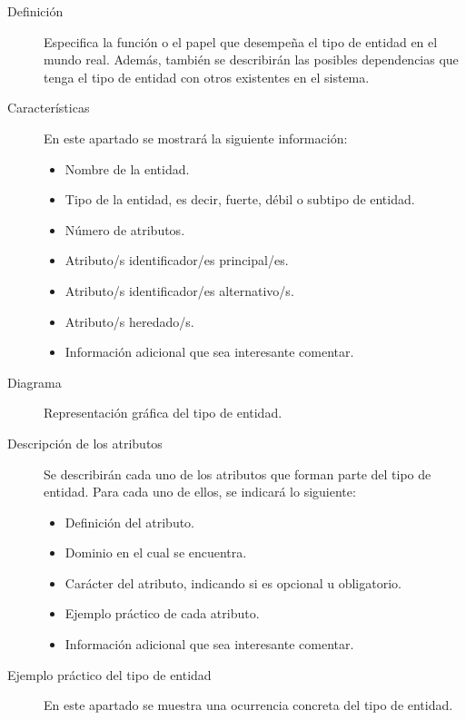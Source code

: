    \begin{description}
      \item[Definición] Especifica la función o el papel que desempeña el tipo
           de entidad en el mundo real. Además, también se describirán las
           posibles dependencias que tenga el tipo de entidad con otros
           existentes en el sistema.

      \item[Características] En este apartado se mostrará la siguiente
           información:

            \begin{itemize}
             \item Nombre de la entidad.
             \item Tipo de la entidad, es decir, fuerte, débil o subtipo de
                   entidad.
             \item Número de atributos.
             \item Atributo/s identificador/es principal/es.
             \item Atributo/s identificador/es alternativo/s.
             \item Atributo/s heredado/s.
             \item Información adicional que sea interesante comentar.
            \end{itemize}

      \item[Diagrama] Representación gráfica del tipo de entidad.

      \item[Descripción de los atributos] Se describirán cada uno de los
           atributos que forman parte del tipo de entidad. Para cada uno de
           ellos, se indicará lo siguiente:

           \begin{itemize}
            \item Definición del atributo.
            \item Dominio en el cual se encuentra.
            \item Carácter del atributo, indicando si es opcional u obligatorio.
            \item Ejemplo práctico de cada atributo.
            \item Información adicional que sea interesante comentar.
           \end{itemize}

      \item[Ejemplo práctico del tipo de entidad] En este apartado se muestra
           una ocurrencia concreta del tipo de entidad.

   \end{description}

